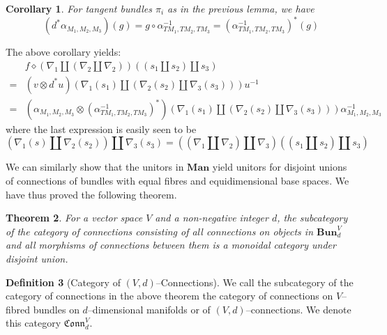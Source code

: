 \documentclass{amsart}
\newcommand{\tensor}{\otimes}
\newcommand{\br}[1]{\left( #1 \right)}
\newcommand{\Man}{\textbf{Man}}
\newcommand{\Bun}{\textbf{Bun}}
\newcommand{\Conn}{\mathfrak{Conn}}
\newtheorem{thm}{Theorem}
\numberwithin{thm}{section}
\newtheorem{cor}[thm]{Corollary}
\theoremstyle{definition}
\newtheorem{defn}[thm]{Definition}
\begin{document}
\begin{cor}
For tangent bundles $\pi_i$ as in the previous lemma, we have
\[
  (d^*\alpha_{M_1, M_2, M_3})(g) = g \circ \alpha_{TM_1, TM_2, TM_3}^{-1}
    = \br{\alpha^{-1}_{TM_1, TM_2, TM_3}}^*(g)
\]
\end{cor}
The above corollary yields:
\begin{align*}
   & f \diamond (\nabla_1 \amalg (\nabla_2 \amalg \nabla_2))(
        (s_1 \amalg s_2) \amalg s_3
     ) \\
  =& (v \tensor d^*u)(
      \nabla_1(s_1) \amalg (\nabla_2(s_2) \amalg \nabla_3(s_3))
     )u^{-1} \\
  =& \br{\alpha_{M_1, M_2, M_3} \tensor \br{\alpha^{-1}_{TM_1, TM_2, TM_3}}^*}(
      \nabla_1(s_1) \amalg (\nabla_2(s_2) \amalg \nabla_3(s_3))
     )\alpha_{M_1, M_2, M_3}^{-1}
\end{align*}
where the last expression is easily seen to be
\[
  (\nabla_1(s) \amalg \nabla_2(s_2)) \amalg \nabla_3(s_3)
  = ((\nabla_1 \amalg \nabla_2) \amalg \nabla_3)((s_1 \amalg s_2) \amalg s_3)
\]

We can similarly show that the unitors in $\Man$ yield unitors for disjoint
unions of connections of bundles with equal fibres and equidimensional base
spaces. We have thus proved the following theorem.
\begin{thm}\label{thm:bundle_cat}
For a vector space $V$ and a non-negative integer $d$, the subcategory of the
category of connections consisting of all connections on objects in
$\Bun_d^{V}$ and all morphisms of connections between them is a monoidal
category under disjoint union.
\end{thm}
\begin{defn}[Category of {$(V, d)$}--Connections]
We call the subcategory of the category of connections in the above theorem the
category of connections on $V$--fibred bundles on $d$--dimensional manifolds or
of $(V, d)$--connections. We denote this category $\Conn^V_d$.
\end{defn}
\end{document}
